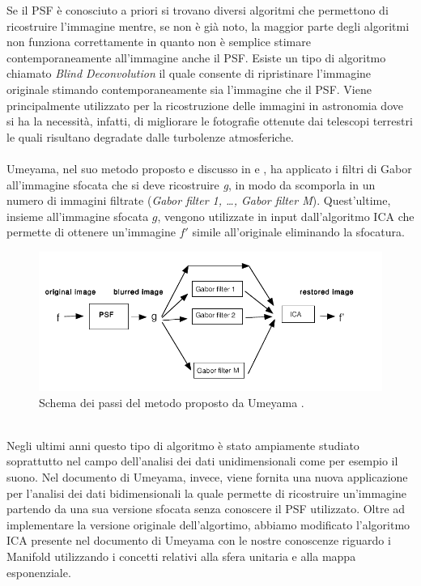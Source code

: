 \documentclass[final]{siamltex}
\begin{document}
Se il PSF \`{e} conosciuto a priori si trovano diversi algoritmi che permettono di ricostruire l'immagine mentre, se non \`{e} gi\`{a} noto, la maggior parte degli algoritmi non funziona correttamente in quanto non \`{e} semplice stimare contemporaneamente all'immagine anche il PSF. Esiste un tipo di algoritmo chiamato \textit{Blind Deconvolution} il quale consente di ripristinare l'immagine originale  stimando contemporaneamente sia l'immagine che il PSF. Viene principalmente utilizzato per la ricostruzione delle immagini in astronomia dove si ha la necessit\`{a}, infatti, di migliorare le fotografie ottenute dai telescopi terrestri le quali risultano degradate dalle turbolenze atmosferiche. 
\\
\\
Umeyama, nel suo metodo proposto e discusso in \cite{Ume} e \cite{Umeprecedente}, ha applicato i filtri di Gabor all'immagine sfocata che si deve ricostruire \textit{g}, in modo da scomporla in un numero di immagini filtrate (\textit{Gabor filter 1, \dots , Gabor filter M}). Quest'ultime, insieme all'immagine sfocata $g$, vengono utilizzate in input dall'algoritmo ICA che permette di ottenere un'immagine $f'$ simile all'originale eliminando la sfocatura.
%
\begin{figure}[h!]
\centering
\includegraphics[width=0.9\columnwidth]{Figura1.png}
\caption{Schema dei passi del metodo proposto da Umeyama \cite{Ume}.}
\label{figura1}
\end{figure}
%
\\Negli ultimi anni questo tipo di algoritmo \`{e} stato ampiamente studiato soprattutto nel campo dell'analisi dei dati unidimensionali come per esempio il suono. Nel documento di Umeyama, invece, viene fornita una nuova applicazione per l'analisi dei dati bidimensionali la quale permette di ricostruire un'immagine partendo da una sua versione sfocata senza conoscere il PSF utilizzato. Oltre ad implementare la versione originale dell'algortimo, abbiamo modificato l'algoritmo ICA presente nel documento di Umeyama \cite{Ume} con le nostre conoscenze riguardo i Manifold utilizzando i concetti relativi alla sfera unitaria e alla mappa esponenziale. \\
\end{document}
